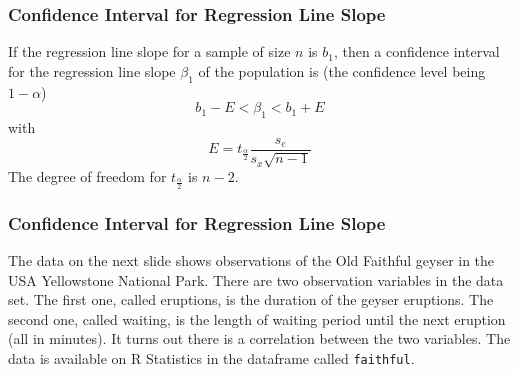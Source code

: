 \documentclass[xcolor=dvipsnames]{beamer}
\begin{document}


\begin{frame}
  \frametitle{Confidence Interval for Regression Line Slope}
  If the regression line slope for a sample of size $n$ is $b_{1}$,
  then a confidence interval for the regression line slope $\beta_{1}$
  of the population is (the confidence level being $1-\alpha$)
  \begin{equation}
    \label{eq:ooghiech}
    b_{1}-E<\beta_{1}<b_{1}+E
  \end{equation}
  with
  \begin{equation}
    \label{eq:ongiemas}
    E=t_{\frac{\alpha}{2}}\frac{s_{e}}{s_{x}\sqrt{n-1}}
  \end{equation}
  The degree of freedom for $t_{\frac{\alpha}{2}}$ is $n-2$.
\end{frame}

\begin{frame}
  \frametitle{Confidence Interval for Regression Line Slope}
  The data on the next slide shows observations of the Old Faithful
  geyser in the USA Yellowstone National Park. There are two
  observation variables in the data set. The first one, called
  eruptions, is the duration of the geyser eruptions. The second one,
  called waiting, is the length of waiting period until the next
  eruption (all in minutes). It turns out there is a correlation
  between the two variables. The data is available on R Statistics in
  the dataframe called \texttt{faithful}.
\end{frame}
\end{document}

